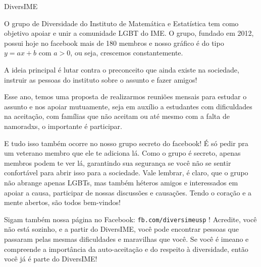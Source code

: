 \begin{subsecao}{DiversIME}

O grupo de Diversidade do Instituto de Matemática e Estatística tem como objetivo
 apoiar e unir a comunidade LGBT do IME. O grupo, fundado em 2012, possui hoje
 no facebook mais de 180 membros e nosso gráfico é do tipo $y = ax + b$ com $a > 0$,
 ou seja, crescemos constantemente.

A ideia principal é lutar contra o preconceito que ainda existe na sociedade,
 instruir as pessoas do instituto sobre o assunto e fazer amigos!

Esse ano, temos uma proposta de realizarmos reuniões mensais para estudar o
 assunto e nos apoiar mutuamente, seja em auxílio a estudantes com dificuldades
 na aceitação, com famílias que não aceitam ou até mesmo com a falta de
 namoradxs, o importante é participar.

E tudo isso também ocorre no nosso grupo secreto do facebook! É só pedir pra um
 veterano membro que ele te adiciona lá. Como o grupo é secreto, apenas membros
 podem te ver lá, garantindo sua segurança se você não se sentir confortável
 para abrir isso para a sociedade. Vale lembrar, é claro, que o grupo não
 abrange apenas LGBTs, mas também héteros amigos e interessados em apoiar
 a causa, participar de nossas discussões e causações. Tendo o coração e a mente
 abertos, são todos bem-vindos!

Sigam também nossa página no Facebook: {\tt fb.com/diversimeusp} !
Acredite, você não está sozinho, e a partir do DiversIME, você pode encontrar
 pessoas que passaram pelas mesmas dificuldades e maravilhas que você. Se você
 é imeano e compreende a importância da auto-aceitação e do respeito à
 diversidade, então você já é parte do DiversIME!

\end{subsecao}
